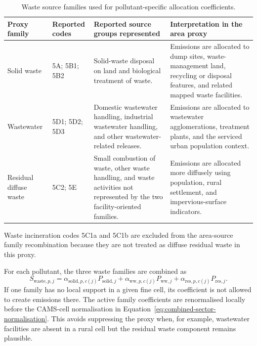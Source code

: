 \begin{table}[htbp]
  \centering
  \caption{Waste source families used for pollutant-specific allocation coefficients.}
  \label{tab:waste-alpha-groups}
  \scriptsize
  \begin{tabular}{p{} p{} p{} p{}}
    \toprule
    Proxy family & Reported codes & Reported source groups represented & Interpretation in the area proxy \\
    \midrule
    Solid waste &
    5A; 5B1; 5B2 &
    Solid-waste disposal on land and biological treatment of waste. &
    Emissions are allocated to dump sites, waste-management land, recycling or disposal features, and related mapped waste facilities. \\
    Wastewater &
    5D1; 5D2; 5D3 &
    Domestic wastewater handling, industrial wastewater handling, and other wastewater-related releases. &
    Emissions are allocated to wastewater agglomerations, treatment plants, and the serviced urban population context. \\
    Residual diffuse waste &
    5C2; 5E &
    Small combustion of waste, other waste handling, and waste activities not represented by the two facility-oriented families. &
    Emissions are allocated more diffusely using population, rural settlement, and impervious-surface indicators. \\
    \bottomrule
  \end{tabular}
\end{table}

Waste incineration codes 5C1a and 5C1b are excluded from the area-source
family recombination because they are not treated as diffuse residual
waste in this proxy.

For each pollutant, the three waste families are combined as
\begin{equation}
  S_{\mathrm{waste},p,j} =
  \alpha_{\mathrm{solid},p,c(j)} P_{\mathrm{solid},j}
  + \alpha_{\mathrm{ww},p,c(j)} P_{\mathrm{ww},j}
  + \alpha_{\mathrm{res},p,c(j)} P_{\mathrm{res},j}.
  \label{eq:waste-composite}
\end{equation}
If one family has no local support in a given fine cell, its coefficient
is not allowed to create emissions there. The active family coefficients
are renormalised locally before the CAMS-cell normalisation in
Equation~\ref{eq:combined-sector-normalisation}. This avoids suppressing
the proxy when, for example, wastewater facilities are absent in a rural
cell but the residual waste component remains plausible.


